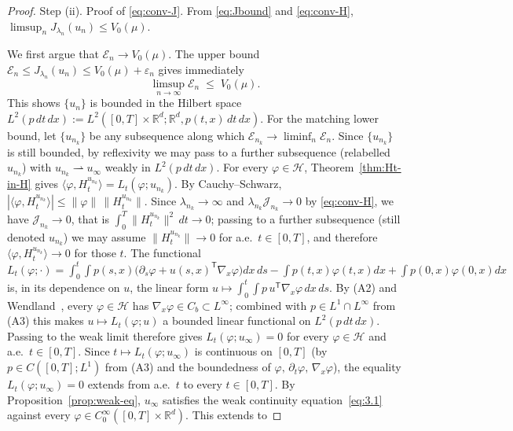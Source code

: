 \documentclass[11pt,leqno]{article}
\theoremstyle{plain}
\theoremstyle{remark}
\theoremstyle{definition}
\numberwithin{equation}{section}
\numberwithin{figure}{section}
\numberwithin{table}{section}
\begin{document}
\begin{proof}
Step (ii). Proof of \eqref{eq:conv-J}.  From \eqref{eq:Jbound}
and \eqref{eq:conv-H},
$\limsup_n J_{\lambda_n}(u_n)\le V_0(\mu)$.

We first argue that $\mathcal{E}_n\to V_0(\mu)$.
The upper bound $\mathcal{E}_n\le J_{\lambda_n}(u_n)\le V_0(\mu)+\varepsilon_n$
gives immediately
\begin{equation}\label{eq:En-limsup}
  \limsup_{n\to\infty}\mathcal{E}_n \;\le\; V_0(\mu).
\end{equation}
This  shows $\{u_n\}$ is bounded in the Hilbert space
$L^2(p\,dt\,dx):=L^2([0,T]\times\mathbb{R}^d;\mathbb{R}^d,p(t,x)\,dt\,dx)$.
For the matching lower bound, let $\{u_{n_k}\}$ be any subsequence
along which $\mathcal{E}_{n_k}\to\liminf_n\mathcal{E}_n$.
Since $\{u_{n_k}\}$ is still bounded, by reflexivity we may pass to a
further subsequence (relabelled $u_{n_k}$) with
$u_{n_k}\rightharpoonup  u_\infty$ weakly in $L^2(p\,dt\,dx)$.
For every $\varphi\in\mathcal{H}$,
Theorem~\ref{thm:Ht-in-H} gives
$\langle\varphi,H_t^{u_{n_k}}\rangle =L_t(\varphi;u_{n_k})$.
By Cauchy--Schwarz, $|\langle\varphi,H_t^{u_{n_k}}\rangle|\le\|\varphi\|\,\|H_t^{u_{n_k}}\|$.
Since $\lambda_{n_k}\to\infty$ and $\lambda_{n_k}\mathcal{J}_{n_k}\to 0$
by \eqref{eq:conv-H}, we have $\mathcal{J}_{n_k}\to 0$, that is
$\int_0^T\|H_t^{u_{n_k}}\|^2\,dt\to 0$; passing to a further
subsequence (still denoted $u_{n_k}$) we may assume
$\|H_t^{u_{n_k}}\|\to 0$ for a.e.\ $t\in[0,T]$, and therefore
$\langle\varphi,H_t^{u_{n_k}}\rangle\to 0$ for those $t$.
The functional $L_t(\varphi;\cdot)=\int_0^t\!\int p(s,x)\bigl(\partial_s\varphi
+u(s,x)^{\mathsf T}\nabla_x\varphi\bigr)dx\,ds-\int p(t,x)\varphi(t,x)dx
+\int p(0,x)\varphi(0,x)dx$ is, in its dependence on $u$, the linear
form $u\mapsto\int_0^t\!\int p\,u^{\mathsf T}\nabla_x\varphi\,dx\,ds$.
By (A2) and Wendland~\cite[Theorem~10.45]{Wendland2005}, every
$\varphi\in\mathcal{H}$ has $\nabla_x\varphi\in C_b\subset L^\infty$;
combined with $p\in L^1\cap L^\infty$ from (A3) this makes
$u\mapsto L_t(\varphi;u)$ a bounded linear functional on
$L^2(p\,dt\,dx)$.  Passing to the weak limit therefore gives
$L_t(\varphi;u_\infty)=0$ for every $\varphi\in\mathcal{H}$ and a.e.\
$t\in[0,T]$.  Since $t\mapsto L_t(\varphi;u_\infty)$ is continuous on
$[0,T]$ (by $p\in C([0,T];L^1)$ from (A3) and the boundedness of
$\varphi,\,\partial_t\varphi,\,\nabla_x\varphi$), the equality
$L_t(\varphi;u_\infty)=0$ extends from a.e.\ $t$ to every $t\in[0,T]$.
By Proposition~\ref{prop:weak-eq}, $u_\infty$ satisfies the weak
continuity equation~\eqref{eq:3.1} against every
$\varphi\in C_0^\infty([0,T]\times\mathbb{R}^d)$.  This extends to

\end{proof}
\end{document}

